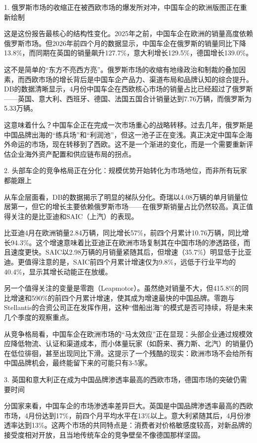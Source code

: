 \documentclass[11pt]{ctexart}
\begin{document}
1. 俄罗斯市场的收缩正在被西欧市场的爆发所对冲，中国车企的欧洲版图正在重新绘制

这是这份报告最核心的结构性变化。2025年之前，中国车企在欧洲的销量高度依赖俄罗斯市场。但2026年前四个月的数据显示，中国车企在俄罗斯的销量同比下降13.8\%，而同期在英国的销量飙升127.7\%，意大利增长129.5\%，德国增长139.0\%。

这不是简单的“东方不亮西方亮”。俄罗斯市场的收缩有地缘政治和制裁的叠加因素，而西欧市场的增长背后是中国车企产品力、渠道布局和品牌认知的综合提升。DB的数据清晰显示，4月份中国车企在西欧核心市场的销量占比已经超过了俄罗斯——英国、意大利、西班牙、德国、法国五国合计销量达到7.76万辆，而俄罗斯为5.33万辆。

这意味着什么？中国车企正在完成一次市场重心的战略转移。过去几年，俄罗斯是中国品牌出海的“练兵场”和“利润池”，但这一池子正在变浅。真正决定中国车企海外命运的市场，现在转移到了西欧。这不是一个渐进的变化，而是一个需要重新评估企业海外资产配置和供应链布局的拐点。

2. 头部车企的竞争格局正在分化：规模优势开始转化为市场地位，而非所有玩家都能跟上

从车企层面看，DB的数据揭示了明显的梯队分化。奇瑞以4.08万辆的单月销量位居第一，但它的增长主要依赖俄罗斯市场——在俄罗斯销量占比仍然较高。真正值得关注的是比亚迪和SAIC（上汽）的表现。

比亚迪4月在欧洲销量2.84万辆，同比增长57\%，前四个月累计10.76万辆，同比增长94.3\%。这个增速意味着比亚迪正在欧洲市场复制其在中国市场的渗透路径，而且速度更快。SAIC以2.98万辆的月销量紧随其后，但增速（35.7\%）明显低于比亚迪。更值得注意的是，SAIC前四个月累计增速仅为9.8\%，远低于行业平均的40.4\%，显示其增长动能正在放缓。

另一个值得关注的变量是零跑（Leapmotor）。虽然绝对销量不大，但415.8\%的同比增速和590\%的前四个月累计增速，使其成为增速最快的中国品牌。零跑与Stellantis的合资公司正在发挥作用，这种“借船出海”的模式是否可持续，将是未来几个季度的观察重点。

从竞争格局看，中国车企在欧洲市场的“马太效应”正在显现：头部企业通过规模效应降低物流、认证和渠道成本，而小体量玩家（如蔚来、赛力斯、北汽）的销量仍在低位徘徊，甚至出现同比下滑。这提示了一个残酷的现实：欧洲市场不会给所有中国品牌机会，最终能留下来的可能只有3-5家。

3. 英国和意大利正在成为中国品牌渗透率最高的西欧市场，德国市场的突破仍需要时间

分国家来看，中国车企的市场渗透率差异巨大。英国是中国品牌渗透率最高的西欧市场，4月份达到17\%，前四个月平均水平在13\%以上。意大利紧随其后，4月份渗透率达到13\%。这两个市场的共同特点是：消费者对价格敏感度较高，对新品牌的接受度相对开放，且当地传统车企的竞争壁垒不像德国那样坚固。
\end{document}
